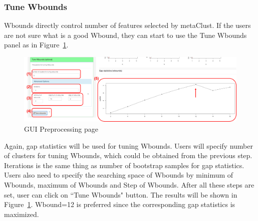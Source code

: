 \subsubsection{Tune Wbounds}
Wbounds directly control number of features selected by metaClust.
If the users are not sure what is a good Wbound,
they can start to use the Tune Wbounds panel as in Figure~\ref{fig:metaClusttuneW}.
\begin{figure}[H]
\begin{center}
\includegraphics[scale=0.35]{./figure/metaClust/tuneW}
\caption{GUI Preprocessing page}
\label{fig:metaClusttuneW}
\end{center}
\end{figure}
Again,
gap statistics will be used for tuning Wbounds.
Users will specify number of clusters for tuning Wbounds, which could be obtained from the previous step.
Iterations is the same thing as number of bootstrap samples for gap statistics.
Users also need to specify the searching space of Wbounds by minimum of Wbounds, maximum of Wbounds and Step of Wbounds.
After all these steps are set,
user can click on ``Tune Wbounds" button.
The results will be shown in Figure~\ref{fig:metaClusttuneW}.
Wbound=12 is preferred since the corresponding gap statistics is maximized.

